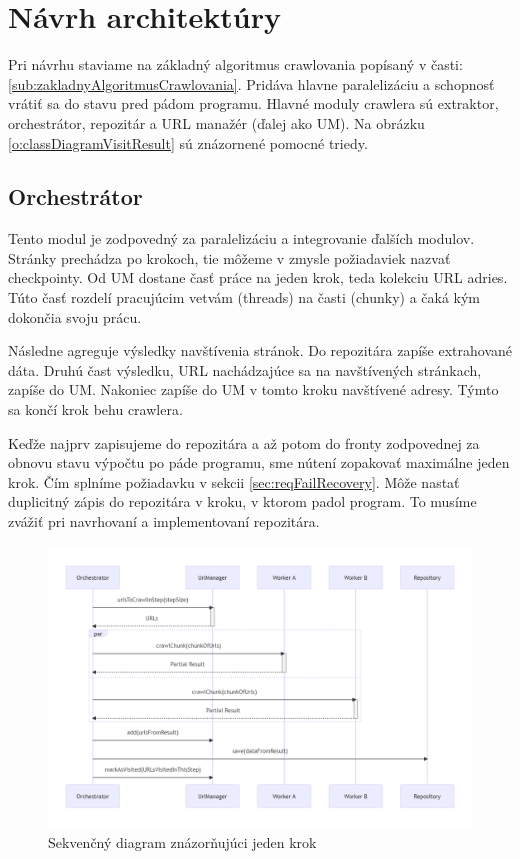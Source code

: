 \section{Návrh architektúry}

Pri návrhu staviame na základný algoritmus crawlovania popísaný v časti: \ref{sub:zakladnyAlgoritmusCrawlovania}. Pridáva hlavne paralelizáciu a schopnosť vrátiť sa do stavu pred pádom programu. Hlavné moduly crawlera sú  extraktor, orchestrátor, repozitár a URL manažér (ďalej ako UM).  Na obrázku \ref{o:classDiagramVisitResult} sú znázornené pomocné triedy.


\subsection{Orchestrátor}
Tento modul je zodpovedný  za paralelizáciu a integrovanie ďalších modulov. Stránky prechádza po krokoch, tie môžeme v zmysle požiadaviek nazvať checkpointy. Od UM dostane časť práce na jeden krok, teda kolekciu URL adries. Túto časť rozdelí pracujúcim vetvám (threads) na časti (chunky) a čaká kým dokončia svoju prácu. 

Následne agreguje výsledky navštívenia stránok. Do repozitára zapíše extrahované dáta. Druhú čast výsledku, URL nachádzajúce sa na navštívených stránkach, zapíše do UM. Nakoniec zapíše do UM v tomto kroku navštívené adresy. Týmto sa končí krok behu crawlera.

Keďže najprv zapisujeme do repozitára a až potom do fronty zodpovednej za obnovu stavu výpočtu po páde programu, sme nútení zopakovať maximálne jeden krok. Čím splníme požiadavku v sekcii \ref{sec:reqFailRecovery}. Môže nastať duplicitný zápis do repozitára v kroku, v ktorom padol program. To musíme zvážiť pri navrhovaní a implementovaní repozitára. 

\begin{figure}[!ht]
    \centering
    \includegraphics[width=.9\textwidth]{figures/seqDiagCrawlStep.png}
    \caption{ Sekvenčný diagram znázorňujúci jeden krok \label{o:seqDiagCrawlStep}}
\end{figure}



